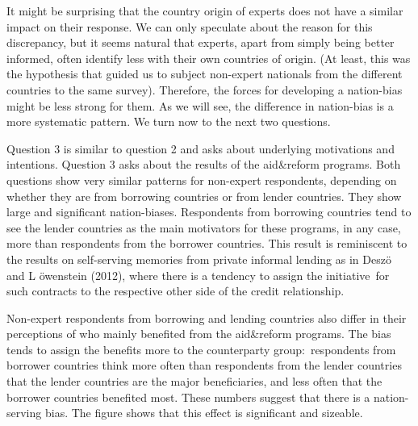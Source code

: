 It might be surprising that the country origin of experts does not have a
similar impact on their response. We can only speculate about the reason for
this discrepancy, but it seems natural that experts, apart from simply being
better informed, often identify less with their own countries of origin. (At
least, this was the hypothesis that guided us to subject non-expert
nationals from the different countries to the same survey). Therefore, the
forces for developing a nation-bias might be less strong for them. As we
will see, the difference in nation-bias is a more systematic pattern. We
turn now to the next two questions.



Question 3 is similar to question 2 and asks about underlying motivations
and intentions. Question 3 asks about the results of the aid\&reform
programs. Both questions show very similar patterns for non-expert
respondents, depending on whether they are from borrowing countries or from
lender countries. They show large and significant nation-biases. Respondents
from borrowing countries tend to see the lender countries as the main
motivators for these programs, in any case, more than respondents from the
borrower countries. This result is reminiscent to the results on
self-serving memories from private informal lending as in Desz\"{o} and L%
\"{o}wenstein (2012), where there is a tendency to assign the initiative\
for such contracts to the respective other side of the credit relationship. 

Non-expert respondents from borrowing and lending countries also differ in
their perceptions of who mainly benefited from the aid\&reform programs. The
bias tends to assign the benefits more to the counterparty group:\
respondents from borrower countries think more often than respondents from
the lender countries that the lender countries are the major beneficiaries,
and less often that the borrower countries benefited most. These numbers
suggest that there is a nation-serving bias. The figure shows that this
effect is significant and sizeable.

